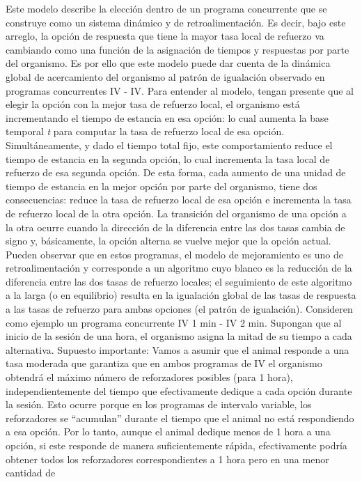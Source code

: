 \documentclass[
  a4paper,
  DIV=11,
  numbers=noendperiod]{scrreprt}
\begin{document}
Este modelo describe la elección dentro de un programa concurrente que
se construye como un sistema dinámico y de retroalimentación. Es decir,
bajo este arreglo, la opción de respuesta que tiene la mayor tasa local
de refuerzo va cambiando como una función de la asignación de tiempos y
respuestas por parte del organismo. Es por ello que este modelo puede
dar cuenta de la dinámica global de acercamiento del organismo al patrón
de igualación observado en programas concurrentes IV - IV. Para entender
al modelo, tengan presente que al elegir la opción con la mejor tasa de
refuerzo local, el organismo está incrementando el tiempo de estancia en
esa opción: lo cual aumenta la base temporal \emph{t} para computar la
tasa de refuerzo local de esa opción. Simultáneamente, y dado el tiempo
total fijo, este comportamiento reduce el tiempo de estancia en la
segunda opción, lo cual incrementa la tasa local de refuerzo de esa
segunda opción. De esta forma, cada aumento de una unidad de tiempo de
estancia en la mejor opción por parte del organismo, tiene dos
consecuencias: reduce la tasa de refuerzo local de esa opción e
incrementa la tasa de refuerzo local de la otra opción. La transición
del organismo de una opción a la otra ocurre cuando la dirección de la
diferencia entre las dos tasas cambia de signo y, básicamente, la opción
alterna se vuelve mejor que la opción actual. Pueden observar que en
estos programas, el modelo de mejoramiento es uno de retroalimentación y
corresponde a un algoritmo cuyo blanco es la reducción de la diferencia
entre las dos tasas de refuerzo locales; el seguimiento de este
algoritmo a la larga (o en equilibrio) resulta en la igualación global
de las tasas de respuesta a las tasas de refuerzo para ambas opciones
(el patrón de igualación). Consideren como ejemplo un programa
concurrente IV 1 min - IV 2 min. Supongan que al inicio de la sesión de
una hora, el organismo asigna la mitad de su tiempo a cada alternativa.
Supuesto importante: Vamos a asumir que el animal responde a una tasa
moderada que garantiza que en ambos programas de IV el organismo
obtendrá el máximo número de reforzadores posibles (para 1 hora),
independientemente del tiempo que efectivamente dedique a cada opción
durante la sesión. Esto ocurre porque en los programas de intervalo
variable, los reforzadores se ``acumulan'' durante el tiempo que el
animal no está respondiendo a esa opción. Por lo tanto, aunque el animal
dedique menos de 1 hora a una opción, si este responde de manera
suficientemente rápida, efectivamente podría obtener todos los
reforzadores correspondientes a 1 hora pero en una menor cantidad de
\end{document}
